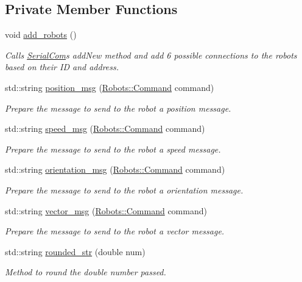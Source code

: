 \subsection*{Private Member Functions}
\begin{DoxyCompactItemize}
\item 
void \hyperlink{class_flying_messenger_ab3f9bc145db951d2fd7629d04d32febc}{add\+\_\+robots} ()
\begin{DoxyCompactList}\small\item\em Calls \hyperlink{class_serial_com}{Serial\+Com}\textquotesingle{}s add\+New method and add 6 possible connections to the robots based on their ID and address. \end{DoxyCompactList}\item 
std\+::string \hyperlink{class_flying_messenger_a72e6aebf3bf1dba3b053a1f2a0fb13f6}{position\+\_\+msg} (\hyperlink{struct_robots_1_1_command}{Robots\+::\+Command} command)
\begin{DoxyCompactList}\small\item\em Prepare the message to send to the robot a position message. \end{DoxyCompactList}\item 
std\+::string \hyperlink{class_flying_messenger_a9d374308f6134d5a5ed5cf3275745301}{speed\+\_\+msg} (\hyperlink{struct_robots_1_1_command}{Robots\+::\+Command} command)
\begin{DoxyCompactList}\small\item\em Prepare the message to send to the robot a speed message. \end{DoxyCompactList}\item 
std\+::string \hyperlink{class_flying_messenger_a33d01541e04f6f2440c2828e49722ed4}{orientation\+\_\+msg} (\hyperlink{struct_robots_1_1_command}{Robots\+::\+Command} command)
\begin{DoxyCompactList}\small\item\em Prepare the message to send to the robot a orientation message. \end{DoxyCompactList}\item 
std\+::string \hyperlink{class_flying_messenger_a1d4e86acb2f76d531f869f28e200d6c3}{vector\+\_\+msg} (\hyperlink{struct_robots_1_1_command}{Robots\+::\+Command} command)
\begin{DoxyCompactList}\small\item\em Prepare the message to send to the robot a vector message. \end{DoxyCompactList}\item 
std\+::string \hyperlink{class_flying_messenger_a687ff0844f83088397544fb7e9aab7cb}{rounded\+\_\+str} (double num)
\begin{DoxyCompactList}\small\item\em Method to round the double number passed. \end{DoxyCompactList}\end{DoxyCompactItemize}
